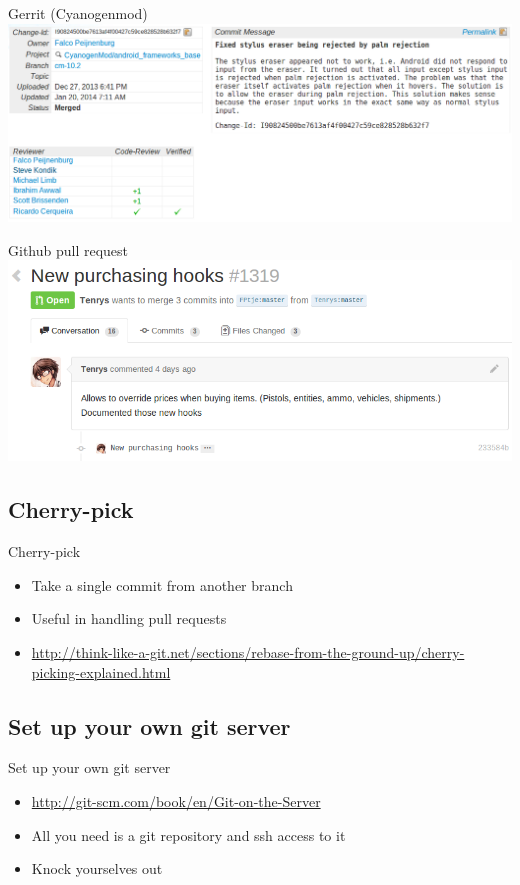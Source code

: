 \documentclass[10pt,a4paper]{beamer}
\begin{document}
\begin{frame}{Gerrit (Cyanogenmod)}
\includegraphics[width=\linewidth]{gerrit.png}
\end{frame}

\begin{frame}{Github pull request}
\includegraphics[width=\linewidth]{githubpull.png}
\end{frame}

\subsection{Cherry-pick}
\begin{frame}{Cherry-pick}
\begin{itemize}
\item Take a single commit from another branch
\item Useful in handling pull requests
\item \href{http://think-like-a-git.net/sections/rebase-from-the-ground-up/cherry-picking-explained.html}{\color{blue}http://think-like-a-git.net/sections/rebase-from-the-ground-up/cherry-picking-explained.html}
\end{itemize}
\end{frame}

\subsection{Set up your own git server}
\begin{frame}{Set up your own git server}
\begin{itemize}
\item \href{http://git-scm.com/book/en/Git-on-the-Server}{\color{blue}http://git-scm.com/book/en/Git-on-the-Server}
\item All you need is a git repository and ssh access to it
\item Knock yourselves out
\end{itemize}
\end{frame}
\end{document}
